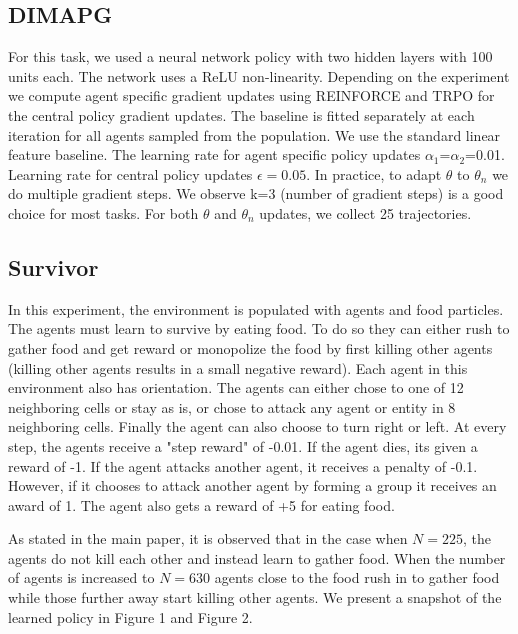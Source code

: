 \documentclass{article}
\begin{document}
\subsection{DIMAPG}
For this task, we used a neural network policy with two hidden layers with 100 units each. The network uses a ReLU non-linearity. Depending on the experiment we compute agent specific gradient updates using REINFORCE and TRPO for the central policy gradient updates. The baseline is fitted separately at each iteration for all agents sampled from the population. We use the standard linear feature baseline. The learning rate for agent specific policy updates $\alpha_1$=$\alpha_2$=0.01. Learning rate for central policy updates $\epsilon=0.05$. In practice, to adapt $\theta$ to $\theta_n$ we do multiple gradient steps. We observe k=3 (number of gradient steps) is a good choice for most tasks. For both $\theta$ and $\theta_n$ updates, we collect 25 trajectories. 

\subsection{Survivor}
In this experiment, the environment is populated with agents and food particles. The agents must learn to survive by eating food. To do so they can either rush to gather food and get reward or monopolize the food by first killing other agents (killing other agents results in a small negative reward). 
Each agent in this environment also has orientation. The agents can either chose to one of 12 neighboring cells or stay as is, or chose to attack any agent or entity in 8 neighboring cells. Finally the agent can also choose to turn right or left. At every step, the agents receive a "step reward" of -0.01. If the agent dies, its given a reward of -1. If the agent attacks another agent, it receives a penalty of -0.1. However, if it chooses to attack another agent by forming a group it receives an award of 1. The agent also gets a reward of +5 for eating food. 

As stated in the main paper, it is observed that in the case when $N=225$, the agents do not kill each other and instead learn to gather food. When the number of agents is increased to $N=630$ agents close to the food rush in to gather food while those further away start killing other agents. We present a snapshot of the learned policy in Figure 1 and Figure 2.
\end{document}
